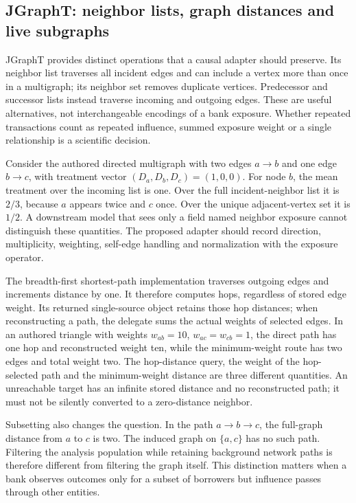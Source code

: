 \subsection{JGraphT: neighbor lists, graph distances and live subgraphs}

JGraphT provides distinct operations that a causal adapter should preserve. Its neighbor list traverses all incident edges and can include a vertex more than once in a multigraph; its neighbor set removes duplicate vertices. Predecessor and successor lists instead traverse incoming and outgoing edges. These are useful alternatives, not interchangeable encodings of a bank exposure. Whether repeated transactions count as repeated influence, summed exposure weight or a single relationship is a scientific decision.\citep{exec25_jnet_jgrapht}

Consider the authored directed multigraph with two edges $a\to b$ and one edge $b\to c$, with treatment vector $(D_a,D_b,D_c)=(1,0,0)$. For node $b$, the mean treatment over the incoming list is one. Over the full incident-neighbor list it is $2/3$, because $a$ appears twice and $c$ once. Over the unique adjacent-vertex set it is $1/2$. A downstream model that sees only a field named neighbor exposure cannot distinguish these quantities. The proposed adapter should record direction, multiplicity, weighting, self-edge handling and normalization with the exposure operator.\citep{exec25_jnet_choice}

The breadth-first shortest-path implementation traverses outgoing edges and increments distance by one. It therefore computes hops, regardless of stored edge weight. Its returned single-source object retains those hop distances; when reconstructing a path, the delegate sums the actual weights of selected edges. In an authored triangle with weights $w_{ab}=10$, $w_{ac}=w_{cb}=1$, the direct path has one hop and reconstructed weight ten, while the minimum-weight route has two edges and total weight two. The hop-distance query, the weight of the hop-selected path and the minimum-weight distance are three different quantities. An unreachable target has an infinite stored distance and no reconstructed path; it must not be silently converted to a zero-distance neighbor.\citep{exec25_jnet_jgrapht,exec25_jnet_choice}

Subsetting also changes the question. In the path $a\to b\to c$, the full-graph distance from $a$ to $c$ is two. The induced graph on $\{a,c\}$ has no such path. Filtering the analysis population while retaining background network paths is therefore different from filtering the graph itself. This distinction matters when a bank observes outcomes only for a subset of borrowers but influence passes through other entities.\citep{exec25_jnet_choice}

